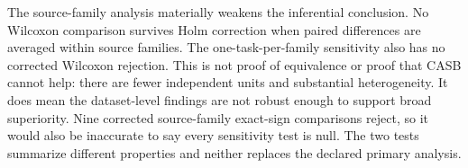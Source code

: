 \documentclass[conference]{IEEEtran}
\begin{document}
The source-family analysis materially weakens the inferential conclusion. No Wilcoxon comparison survives Holm correction when paired differences are averaged within source families. The one-task-per-family sensitivity also has no corrected Wilcoxon rejection. This is not proof of equivalence or proof that CASB cannot help: there are fewer independent units and substantial heterogeneity. It does mean the dataset-level findings are not robust enough to support broad superiority. Nine corrected source-family exact-sign comparisons reject, so it would also be inaccurate to say every sensitivity test is null. The two tests summarize different properties and neither replaces the declared primary analysis.
\begin{table}[!htbp]
\centering\small
\caption{Omnibus Friedman tests on the 40 complete datasets. Holm correction over four metrics within classifier. Rejection does not identify a CASB winner.}\label{tab:friedman}
\end{table}
\end{document}
